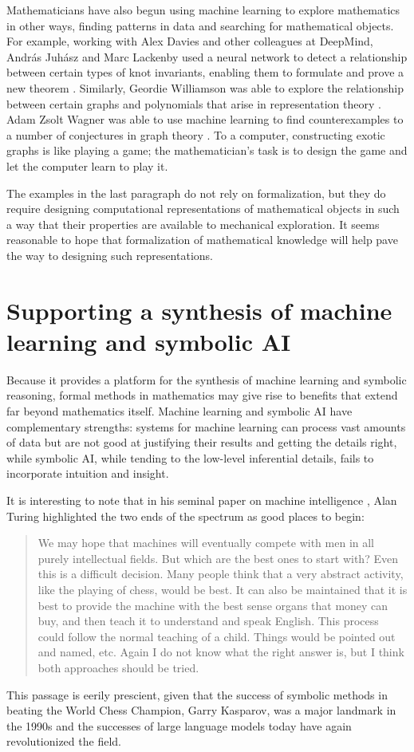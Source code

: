 \documentclass{amsart}
\theoremstyle{definition}
\theoremstyle{remark}
\numberwithin{equation}{section}
\begin{document}
Mathematicians have also begun using machine learning to explore mathematics in other ways, finding patterns in data and searching for mathematical objects. For example, working with Alex Davies and other colleagues at DeepMind, Andr\'as Juh\'asz and Marc Lackenby used a neural network to detect a relationship between certain types of knot invariants, enabling them to formulate and prove a new theorem \cite{davies:et:al:21}. Similarly, Geordie Williamson was able to explore the relationship between certain graphs and polynomials that arise in representation theory \cite{davies:et:al:21}. Adam Zsolt Wagner was able to use machine learning to find counterexamples to a number of conjectures in graph theory \cite{wagner:21}. To a computer, constructing exotic graphs is like playing a game; the mathematician's task is to design the game and let the computer learn to play it.

The examples in the last paragraph do not rely on formalization, but they do require designing computational representations of mathematical objects in such a way that their properties are available to mechanical exploration. It seems reasonable to hope that formalization of mathematical knowledge will help pave the way to designing such representations.


\section{Supporting a synthesis of machine learning and symbolic AI}
\label{section:supporting:a:synthesis}

Because it provides a platform for the synthesis of machine learning and symbolic reasoning, formal methods in mathematics may give rise to benefits that extend far beyond mathematics itself. Machine learning and symbolic AI have complementary strengths: systems for machine learning can process vast amounts of data but are not good at justifying their results and getting the details right, while symbolic AI, while tending to the low-level inferential details, fails to incorporate intuition and insight.

It is interesting to note that in his seminal paper on machine intelligence \cite{turing:50}, Alan Turing highlighted the two ends of the spectrum as good places to begin:
\begin{quote}
We may hope that machines will eventually compete with men in all purely intellectual fields. But which are the best ones to start with? Even this is a difficult decision. Many people think that a very abstract activity, like the playing of chess, would be best. It can also be maintained that it is best to provide the machine with the best sense organs that money can buy, and then teach it to understand and speak English. This process could follow the normal teaching of a child. Things would be pointed out and named, etc. Again I do not know what the right answer is, but I think both approaches should be tried.
\end{quote}
This passage is eerily prescient, given that the success of symbolic methods in beating the World Chess Champion, Garry Kasparov, was a major landmark in the 1990s and the successes of large language models today have again revolutionized the field.
\end{document}
